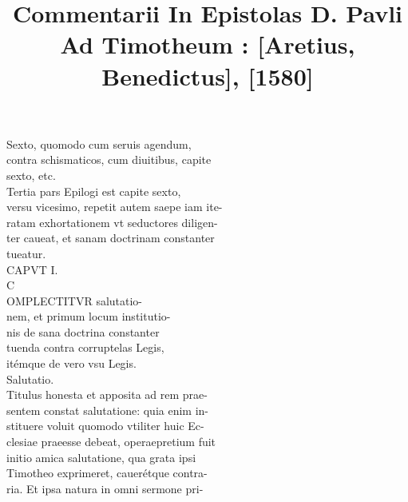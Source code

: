 \documentclass{article}
\begin{document}
\date{}
        \title{Commentarii In Epistolas D. Pavli Ad Timotheum : [Aretius, Benedictus], [1580]}
\maketitle

\begin{pages} 
\beginnumbering
        Sexto, quomodo cum seruis agendum, \\
                contra schismaticos, cum diuitibus, capite \\
                sexto, etc. \\
                Tertia pars Epilogi est capite sexto, \\
                versu vicesimo, repetit autem saepe iam ite- \\
                ratam exhortationem vt seductores diligen- \\
                ter caueat, et sanam doctrinam constanter \\
                tueatur. \\
                CAPVT I. \\
                C \\
                OMPLECTITVR salutatio- \\
                nem, et primum locum institutio- \\
                nis de sana doctrina constanter \\
                tuenda contra corruptelas Legis, \\
                itémque de vero vsu Legis. \\
                Salutatio. \\
                Titulus honesta et apposita ad rem prae- \\
                sentem constat salutatione: quia enim in- \\
                stituere voluit quomodo vtiliter huic Ec- \\
                clesiae praeesse debeat, operaepretium fuit \\
                initio amica salutatione, qua grata ipsi \\
                Timotheo exprimeret, cauerétque contra- \\
                ria. Et ipsa natura in omni sermone pri- \\

\end{pages}
\end{document}
